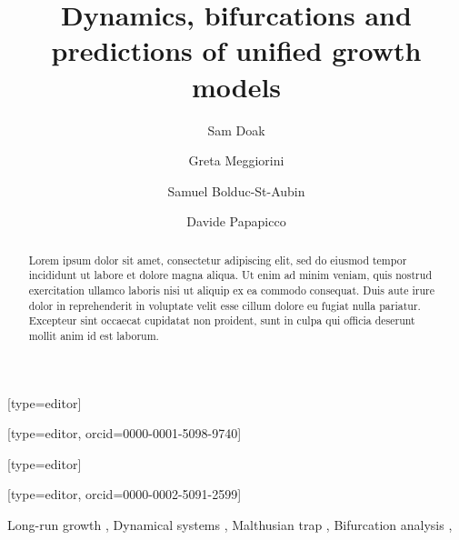 \documentclass[a4paper,fleqn]{cas-sc}
\begin{document}
\let\WriteBookmarks\relax
\def\floatpagepagefraction{1}
\def\textpagefraction{.001}
\shorttitle{}

\title[mode = title]{Dynamics, bifurcations and predictions of unified growth models}

\author[1]{Sam Doak}[type=editor]

\author[2]{Greta Meggiorini}[type=editor, orcid=0000-0001-5098-9740]

\cormark[1]

\author[1]{Samuel Bolduc-St-Aubin}[type=editor]

\author[1]{Davide Papapicco}[type=editor, orcid=0000-0002-5091-2599]

\begin{titlepage}

\begin{abstract}
Lorem ipsum dolor sit amet, consectetur adipiscing elit, sed do eiusmod tempor incididunt ut labore et dolore magna aliqua. Ut enim ad minim veniam, quis nostrud exercitation ullamco laboris nisi ut aliquip ex ea commodo consequat. Duis aute irure dolor in reprehenderit in voluptate velit esse cillum dolore eu fugiat nulla pariatur. Excepteur sint occaecat cupidatat non proident, sunt in culpa qui officia deserunt mollit anim id est laborum.
\end{abstract}


\begin{keywords}
Long-run growth \sep 
Dynamical systems \sep
Malthusian trap \sep
Bifurcation analysis \sep
\end{keywords}

\end{titlepage}
\end{document}
